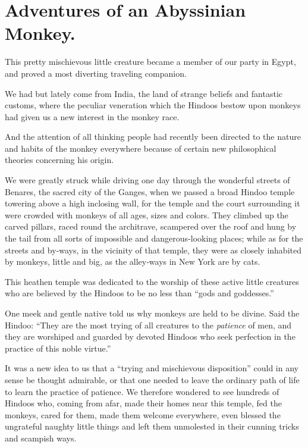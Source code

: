 \documentclass[12pt]{book}
\begin{document}
\chapter{Adventures of an Abyssinian Monkey.}

This pretty mischievous little creature became a member of our party in Egypt,
and proved a most diverting traveling companion.

We had but lately come from India, the land of strange beliefs and fantastic
customs, where the peculiar veneration which the Hindoos bestow upon monkeys
had given us a new interest in the monkey race.

And the attention of all thinking people had recently been directed to the
nature and habits of the monkey everywhere because of certain new philosophical
theories concerning his origin.

We were greatly struck while driving one day through the wonderful streets
of Benares, the sacred city of the Ganges, when we passed a broad Hindoo temple
towering above a high inclosing wall, for the temple and the court surrounding it
were crowded with monkeys of all ages, sizes and colors. They climbed up the
carved pillars, raced round the architrave, scampered over the roof and hung by
the tail from all sorts of impossible and dangerous‐looking places; while as for the
streets and by‐ways, in the vicinity of that temple, they were as closely inhabited
by monkeys, little and big, as the alley‐ways in New York are by cats.

This heathen temple was dedicated to the worship of these active little creatures who are believed by the Hindoos to be no less than “gods and goddesses.”

One meek and gentle native told us why monkeys are held to be divine. Said
the Hindoo: “They are the most trying of all creatures to the \emph{patience} of men, and
they are worshiped and guarded by devoted Hindoos who seek perfection in the
practice of this noble virtue.”

It was a new idea to us that a “trying and mischievous disposition” could in
any sense be thought admirable, or that one needed to leave the ordinary path
of life to learn the practice of patience. We therefore wondered to see hundreds
of Hindoos who, coming from afar, made their homes near this temple, fed the
monkeys, cared for them, made them welcome everywhere, even blessed the
ungrateful naughty little things and left them unmolested in their cunning tricks
and scampish ways.
\end{document}

